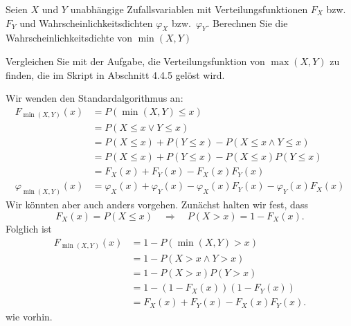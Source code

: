 Seien $X$ und $Y$  unabhängige Zufallsvariablen mit Verteilungsfunktionen
$F_X$ bzw.~$F_Y$ und Wahrscheinlichkeitsdichten $\varphi_X$ bzw.~$\varphi_Y$.
Berechnen Sie die Wahrscheinlichkeitsdichte von $\min(X,Y)$

\begin{hinweis}
Vergleichen Sie mit der Aufgabe, die Verteilungsfunktion
von $\operatorname{max}(X, Y)$ zu finden, die im Skript in Abschnitt 4.4.5
gelöst wird.
\end{hinweis}

\begin{loesung}
Wir wenden den Standardalgorithmus an:
\begin{align*}
F_{\min(X,Y)}(x)
&=
P(\min(X,Y)\le x)
\\
&=P(X\le x\vee Y\le x)
\\
&=P(X\le x) + P(Y\le x) - P(X\le x\wedge Y\le x)
\\
&=P(X\le x) + P(Y\le x) - P(X\le x)P(Y\le x)
\\
&=F_X(x)+F_Y(x)-F_X(x)F_Y(x)
\\
\varphi_{\min(X,Y)}(x)
&=
\varphi_X(x)+\varphi_Y(x)-\varphi_X(x)F_Y(x)-\varphi_Y(x)F_X(x)
\end{align*}
Wir könnten aber auch anders vorgehen. Zunächst halten wir fest,
dass
\[
F_X(x)=P(X\le x)
\quad
\Rightarrow
\quad
P(X>x)=1-F_X(x).
\]
Folglich ist
\begin{align*}
F_{\min(X,Y)}(x)
&=
1-P(\min(X,Y) > x)
\\
&=
1-P(X>x\wedge Y>x)
\\
&=1-P(X>x)P(Y>x)
\\
&=1-(1-F_X(x))(1-F_Y(x))
\\
&=
F_X(x)+F_Y(x)-F_X(x)F_Y(x).
\end{align*}
wie vorhin.
\end{loesung}

